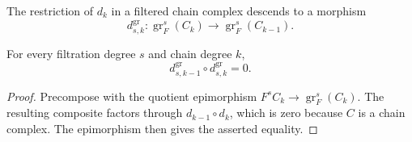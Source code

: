 \begin{definition}
  \leanok
  \label{def:core-associated-graded-differential}
  The restriction of $d_k$ in a filtered chain complex descends to a morphism
  \[
    d^{\operatorname{gr}}_{s,k}:
    \operatorname{gr}^s_F(C_k)\longrightarrow
    \operatorname{gr}^s_F(C_{k-1}).
  \]
\end{definition}

\begin{theorem}
  \leanok
  \label{thm:core-associated-graded-differential-sq}
  For every filtration degree $s$ and chain degree $k$,
  \[
    d^{\operatorname{gr}}_{s,k-1}\circ
    d^{\operatorname{gr}}_{s,k}=0.
  \]
\end{theorem}

\begin{proof}
  \leanok
  Precompose with the quotient epimorphism $F^sC_k\longrightarrow
  \operatorname{gr}^s_F(C_k)$.  The resulting composite factors through
  $d_{k-1}\circ d_k$, which is zero because $C$ is a chain complex.  The
  epimorphism then gives the asserted equality.
\end{proof}
